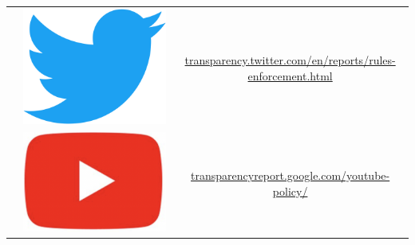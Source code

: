 \documentclass{article}
\begin{document}
\begin{table}[h]
\begin{tabular}{|c|c|c|}
                                           & \includegraphics[scale=0.007]{./img/tw_logo.png}   & \href{https://transparency.twitter.com/en/reports/rules-enforcement.html}{transparency.twitter.com/en/reports/rules-enforcement.html}                \\ \cline{2-3} 
                                           & \includegraphics[scale=0.03]{./img/yt_logo.png}  & \href{https://transparencyreport.google.com/youtube-policy/}{transparencyreport.google.com/youtube-policy/}                              \\ \hline

\end{tabular}
\end{table}
\end{document}
